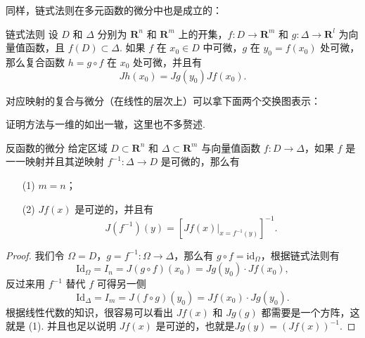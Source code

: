 同样，链式法则在多元函数的微分中也是成立的：

\begin{theorem}{链式法则}{}
    设 $D$ 和 $\Delta$ 分别为 $\mathbf{R}^n$ 和 $\mathbf{R}^m$ 上的开集，$f: D\to \mathbf{R}^m$ 和 $g: \Delta\to \mathbf{R}^l$ 为向量值函数，且 $f(D)\subset \Delta$. 如果 $f$ 在 $x_0\in D$ 中可微，$g$ 在 $y_0 = f(x_0)$ 处可微，那么复合函数 $h = g\circ f$ 在 $x_0$ 处可微，并且有\[Jh(x_0) = Jg(y_0)Jf(x_0).\]

    对应映射的复合与微分（在线性的层次上）可以拿下面两个交换图表示：
    \begin{center}
        \qquad
    \end{center}
\end{theorem}

证明方法与一维的如出一辙，这里也不多赘述.

\begin{corollary}{反函数的微分}{}
    给定区域 $D\subset \mathbf{R}^n$ 和 $\Delta \subset \mathbf{R}^m$ 与向量值函数 $f: D\to \Delta$，如果 $f$ 是一一映射并且其逆映射 $f^{-1}: \Delta\to D$ 是可微的，那么有
    \begin{enumerate}
        \item[(1)] $m = n$；
        \item[(2)] $Jf(x)$ 是可逆的，并且有 \[J(f^{-1})(y) = [\left.Jf(x)\right|_{x = f^{-1}(y)}]^{-1}.\]
    \end{enumerate}
\end{corollary}

\begin{proof}
    我们令 $\Omega = D$，$g = f^{-1}: \Omega\to\Delta$，那么有 $g \circ f = \mathrm{id}_{\Omega}$，根据链式法则有 \[\mathrm{Id}_{\Omega} = I_{n} = J(g\circ f)(x_0) = Jg(y_0)\cdot Jf(x_0),\]
    反过来用 $f^{-1}$ 替代 $f$ 可得另一侧\[\mathrm{Id}_{\Delta} = I_m = J(f\circ g)(y_0) = Jf(x_0)\cdot Jg(y_0).\]
    根据线性代数的知识，很容易可以看出 $Jf(x)$ 和 $Jg(g)$ 都需要是一个方阵，这就是 (1). 并且也足以说明 $Jf(x)$ 是可逆的，也就是$Jg(y) = (Jf(x))^{-1}.$
\end{proof}

